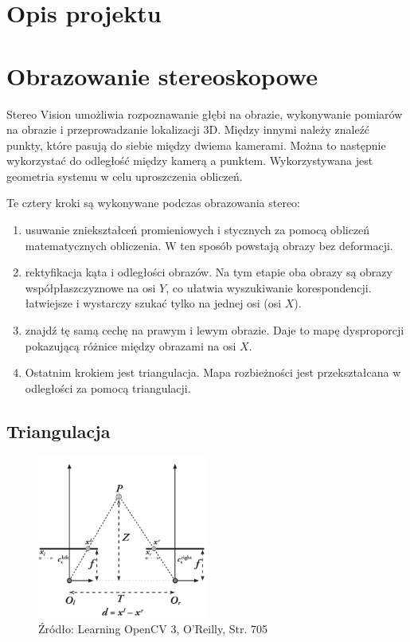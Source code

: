 \documentclass[magisterska]{pracadypl}
\begin{document}
\section{Opis projektu}

\section{Obrazowanie stereoskopowe}

Stereo Vision umożliwia rozpoznawanie głębi na obrazie, wykonywanie pomiarów na obrazie
i przeprowadzanie lokalizacji 3D. Między innymi należy znaleźć punkty, które pasują do siebie między dwiema kamerami. Można to następnie wykorzystać do odległość między kamerą a punktem. Wykorzystywana jest geometria systemu w celu uproszczenia obliczeń.

Te cztery kroki są wykonywane podczas obrazowania stereo:

\begin{enumerate}
  \item usuwanie zniekształceń promieniowych i stycznych za pomocą obliczeń matematycznych
obliczenia. W ten sposób powstają obrazy bez deformacji.
  \item rektyfikacja kąta i odległości obrazów. Na tym etapie oba obrazy są
obrazy współpłaszczyznowe na osi $Y$, co ułatwia wyszukiwanie korespondencji.
łatwiejsze i wystarczy szukać tylko na jednej osi (osi $X$).
  \item znajdź tę samą cechę na prawym i lewym obrazie. Daje to mapę dysproporcji pokazującą różnice między obrazami na osi $X$.
  \item Ostatnim krokiem jest triangulacja. Mapa rozbieżności jest przekształcana w odległości za pomocą triangulacji.
\end{enumerate}

\subsection{Triangulacja}

\begin{figure}[h]  %
    \centering  %
    \includegraphics[width=0.5\textwidth]{images/triangulation.png}  %
    \captionsetup{labelformat=empty, font=footnotesize}
    \caption{Źródło: Learning OpenCV 3, O'Reilly, Str. 705}
    \label{fig:rpi}  %
\end{figure}
\end{document}
